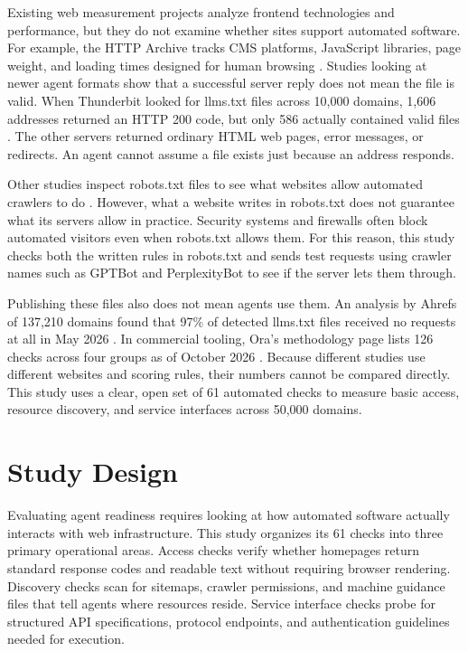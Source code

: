 \documentclass{article}
\begin{document}
Existing web measurement projects analyze frontend technologies and performance, but they do not examine whether sites support automated software. For example, the HTTP Archive tracks CMS platforms, JavaScript libraries, page weight, and loading times designed for human browsing \cite{ref21}. Studies looking at newer agent formats show that a successful server reply does not mean the file is valid. When Thunderbit looked for llms.txt files across 10,000 domains, 1,606 addresses returned an HTTP 200 code, but only 586 actually contained valid files \cite{ref22}. The other servers returned ordinary HTML web pages, error messages, or redirects. An agent cannot assume a file exists just because an address responds.

Other studies inspect robots.txt files to see what websites allow automated crawlers to do \cite{ref23,ref24,ref25}. However, what a website writes in robots.txt does not guarantee what its servers allow in practice. Security systems and firewalls often block automated visitors even when robots.txt allows them. For this reason, this study checks both the written rules in robots.txt and sends test requests using crawler names such as GPTBot and PerplexityBot to see if the server lets them through.

Publishing these files also does not mean agents use them. An analysis by Ahrefs of 137,210 domains found that 97\% of detected llms.txt files received no requests at all in May 2026 \cite{ref26}. In commercial tooling, Ora's methodology page lists 126 checks across four groups as of October 2026 \cite{ref29}. Because different studies use different websites and scoring rules, their numbers cannot be compared directly. This study uses a clear, open set of 61 automated checks to measure basic access, resource discovery, and service interfaces across 50,000 domains.

\section{Study Design}

Evaluating agent readiness requires looking at how automated software actually interacts with web infrastructure. This study organizes its 61 checks into three primary operational areas. Access checks verify whether homepages return standard response codes and readable text without requiring browser rendering. Discovery checks scan for sitemaps, crawler permissions, and machine guidance files that tell agents where resources reside. Service interface checks probe for structured API specifications, protocol endpoints, and authentication guidelines needed for execution.
\end{document}
